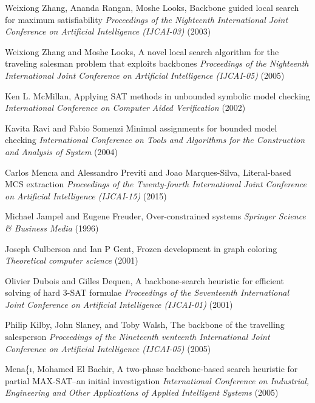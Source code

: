 	Weixiong Zhang, Ananda Rangan, Moshe Looks,
        Backbone guided local search for maximum satisfiability
		\textit{Proceedings of the Nighteenth International Joint Conference on Artificial Intelligence (IJCAI-03)}
        (2003)
		
	Weixiong Zhang and Moshe Looks,
        A novel local search algorithm for the traveling salesman problem that exploits backbones
		\textit{Proceedings of the Nighteenth International Joint Conference on Artificial Intelligence (IJCAI-05)}
        (2005)

	Ken L. McMillan,
        Applying {SAT} methods in unbounded symbolic model checking
		\textit{International Conference on Computer Aided Verification}
        (2002)

	Kavita Ravi and Fabio Somenzi
        Minimal assignments for bounded model checking
		\textit{International Conference on Tools and Algorithms for the Construction and Analysis of System}
        (2004)

	Carlos Menc{\i}a and Alessandro Previti and Joao Marques-Silva,
        Literal-based MCS extraction
		\textit{Proceedings of the Twenty-fourth International Joint Conference on Artificial Intelligence (IJCAI-15)}
        (2015)

	Michael Jampel and Eugene Freuder,
        Over-constrained systems
		\textit{Springer Science \& Business Media}
        (1996)
		
	Joseph Culberson and Ian P Gent,
        Frozen development in graph coloring
		\textit{Theoretical computer science}
        (2001)

	Olivier Dubois and Gilles Dequen,
        A backbone-search heuristic for efficient solving of hard 3-SAT formulae
		\textit{Proceedings of the Seventeenth International Joint Conference on Artificial Intelligence (IJCAI-01)}
        (2001)
		
	Philip Kilby, John Slaney, and Toby Walsh,
        The backbone of the travelling salesperson
		\textit{Proceedings of the Nineteenth  venteenth International Joint Conference on Artificial Intelligence (IJCAI-05)}
        (2005)

	Mena{\{\i}, Mohamed El Bachir,
        A two-phase backbone-based search heuristic for partial MAX-{SAT}--an initial investigation
		\textit{International Conference on Industrial, Engineering and Other Applications of Applied Intelligent Systems}
        (2005)

